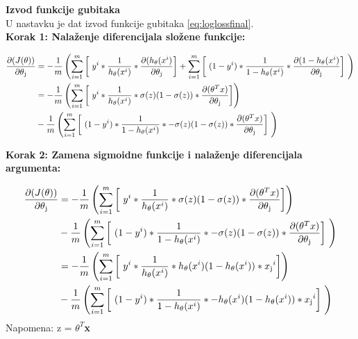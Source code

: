 \documentclass[a4paper,12pt]{report}
\begin{document}
\textbf{Izvod funkcije gubitaka}\\

U nastavku je dat izvod funkcije gubitaka \ref{eq:loglossfinal}.\\

\textbf{Korak 1: Nalaženje diferencijala složene funkcije:}

\begin{equation}
\begin{split}
	\frac{\partial (J(\theta))}{\partial \theta\textsubscript{j}} & = -  \frac{1}{m} \left( \sum_{i=1}^{m} \left[\ y^i * \frac{1}{h\textsubscript {$\theta$} (x^i)}  * \frac{\partial (h\textsubscript {$\theta$}(x^i)}{\partial \theta\textsubscript{j}}\right] + \sum_{i=1}^{m} \left[\ (1 - y^i) * \frac{1}{1 - h\textsubscript {$\theta$} (x^i)}    * \frac{\partial (1 -h\textsubscript {$\theta$}(x^i)}{\partial \theta\textsubscript{j}}\right]\ \right) \\
 		& = - \frac{1}{m} \left( \sum_{i=1}^{m} \left[\ y^i * \frac{1}{h\textsubscript {$\theta$} (x^i)} * \sigma(z)(1-\sigma(z))  * \frac{\partial (\theta^T x)}{\partial \theta\textsubscript{j}} \right] \right) \\ 
 		& - \frac{1}{m} \left( \sum_{i=1}^{m} \left[\ (1 - y^i) * \frac{1}{1 - h\textsubscript {$\theta$} (x^i)} * -\sigma(z)(1-\sigma(z))  * \frac{\partial (\theta^T x)}{\partial \theta\textsubscript{j}}\right]\ \right) \\
\end{split}
\end{equation}

\textbf{Korak 2: Zamena sigmoidne funkcije i nalaženje diferencijala argumenta:} 

\begin{equation}
\begin{split}
	\frac{\partial (J(\theta))}{\partial \theta\textsubscript{j}} & = - \frac{1}{m} \left( \sum_{i=1}^{m} \left[\ y^i * \frac{1}{h\textsubscript {$\theta$} (x^i)} * \sigma(z)(1-\sigma(z))  * \frac{\partial (\theta^T x)}{\partial \theta\textsubscript{j}} \right] \right) \\ 
 		& - \frac{1}{m} \left( \sum_{i=1}^{m} \left[\ (1 - y^i) * \frac{1}{1 - h\textsubscript {$\theta$} (x^i)} * -\sigma(z)(1-\sigma(z))  * \frac{\partial (\theta^T x)}{\partial \theta\textsubscript{j}}\right]\ \right) \\
 		& = - \frac{1}{m} \left( \sum_{i=1}^{m} \left[\ y^i * \frac{1}{h\textsubscript {$\theta$} (x^i)} * {h\textsubscript {$\theta$} (x^i)}(1-{h\textsubscript {$\theta$} (x^i)})  * x\textsubscript{j}^i \right] \right) \\ 
 		& - \frac{1}{m} \left( \sum_{i=1}^{m} \left[\ (1 - y^i) * \frac{1}{1 - h\textsubscript {$\theta$} (x^i)} * -{h\textsubscript {$\theta$} (x^i)}(1-{h\textsubscript {$\theta$} (x^i)})  * x\textsubscript{j}^i\right]\ \right) \\
\end{split}
\end{equation}
Napomena: z = \textbf{$\theta^T$x} \\
\end{document}
